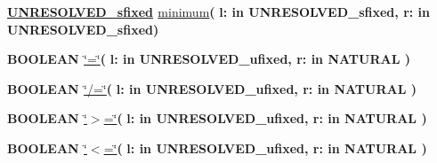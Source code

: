 \begin{DoxyCompactItemize}
\item 
{\bfseries {\bfseries {\bfseries \hyperlink{classfixed__pkg_aa723b28a027c3c0f9bca02d75e8df4d6}{U\+N\+R\+E\+S\+O\+L\+V\+E\+D\+\_\+sfixed}} \textcolor{vhdlchar}{ }}} \hyperlink{classfixed__pkg_a9d998ae3f8c174511bfd67b611b10096}{minimum}{\bfseries  ( }{\bfseries \textcolor{vhdlchar}{l\+: }\textcolor{stringliteral}{in }\textcolor{vhdlchar}{U\+N\+R\+E\+S\+O\+L\+V\+E\+D\+\_\+sfixed}}{\bfseries  , \textcolor{vhdlchar}{r\+: }\textcolor{stringliteral}{in }\textcolor{vhdlchar}{U\+N\+R\+E\+S\+O\+L\+V\+E\+D\+\_\+sfixed}}{\bfseries  )} 
\item 
{\bfseries {\bfseries \textcolor{comment}{B\+O\+O\+L\+E\+A\+N}\textcolor{vhdlchar}{ }}} \hyperlink{classfixed__pkg_a7949e9258ea0749e3b35961feea8db87}{\char`\"{}=\char`\"{}}{\bfseries  ( }{\bfseries \textcolor{vhdlchar}{l\+: }\textcolor{stringliteral}{in }\textcolor{vhdlchar}{U\+N\+R\+E\+S\+O\+L\+V\+E\+D\+\_\+ufixed}}{\bfseries  , \textcolor{vhdlchar}{r\+: }\textcolor{stringliteral}{in }{\bfseries \textcolor{comment}{N\+A\+T\+U\+R\+A\+L}\textcolor{vhdlchar}{ }}}{\bfseries  )} 
\item 
{\bfseries {\bfseries \textcolor{comment}{B\+O\+O\+L\+E\+A\+N}\textcolor{vhdlchar}{ }}} \hyperlink{classfixed__pkg_a00087aded97b434060226b9ba63a9077}{\char`\"{}/=\char`\"{}}{\bfseries  ( }{\bfseries \textcolor{vhdlchar}{l\+: }\textcolor{stringliteral}{in }\textcolor{vhdlchar}{U\+N\+R\+E\+S\+O\+L\+V\+E\+D\+\_\+ufixed}}{\bfseries  , \textcolor{vhdlchar}{r\+: }\textcolor{stringliteral}{in }{\bfseries \textcolor{comment}{N\+A\+T\+U\+R\+A\+L}\textcolor{vhdlchar}{ }}}{\bfseries  )} 
\item 
{\bfseries {\bfseries \textcolor{comment}{B\+O\+O\+L\+E\+A\+N}\textcolor{vhdlchar}{ }}} \hyperlink{classfixed__pkg_a4cd07e388cdbb3996dd11f56781d3758}{\char`\"{}$>$=\char`\"{}}{\bfseries  ( }{\bfseries \textcolor{vhdlchar}{l\+: }\textcolor{stringliteral}{in }\textcolor{vhdlchar}{U\+N\+R\+E\+S\+O\+L\+V\+E\+D\+\_\+ufixed}}{\bfseries  , \textcolor{vhdlchar}{r\+: }\textcolor{stringliteral}{in }{\bfseries \textcolor{comment}{N\+A\+T\+U\+R\+A\+L}\textcolor{vhdlchar}{ }}}{\bfseries  )} 
\item 
{\bfseries {\bfseries \textcolor{comment}{B\+O\+O\+L\+E\+A\+N}\textcolor{vhdlchar}{ }}} \hyperlink{classfixed__pkg_a65b73a94d4fe541a941f431175b342b7}{\char`\"{}$<$=\char`\"{}}{\bfseries  ( }{\bfseries \textcolor{vhdlchar}{l\+: }\textcolor{stringliteral}{in }\textcolor{vhdlchar}{U\+N\+R\+E\+S\+O\+L\+V\+E\+D\+\_\+ufixed}}{\bfseries  , \textcolor{vhdlchar}{r\+: }\textcolor{stringliteral}{in }{\bfseries \textcolor{comment}{N\+A\+T\+U\+R\+A\+L}\textcolor{vhdlchar}{ }}}{\bfseries  )} 

\end{DoxyCompactItemize}
